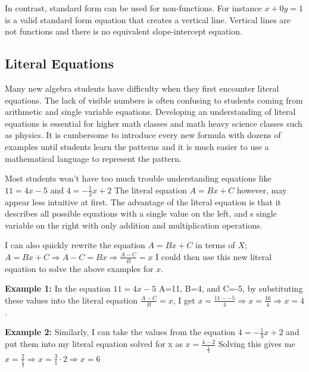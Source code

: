 \documentclass{article}
\begin{document}
\bigskip

In contrast, standard form can be used for non-functions. For instance $x+0y=1$ is a valid standard form equation that creates a vertical line. Vertical lines are not functions and there is no equivalent slope-intercept equation.

\subsection{Literal Equations}
Many new algebra students have difficulty when they first encounter literal equations. The lack of visible numbers is often confusing to students coming from arithmetic and single variable equations. Developing an understanding of literal equations is essential for higher math classes and math heavy science classes such as physics. It is cumbersome to introduce every new formula with dozens of examples until students learn the patterns and it is much easier to use a mathematical language to represent the pattern.

\bigskip

Most students won't have too much trouble understanding equations like $11=4x-5$ and $4=-\frac{1}{3}x+2$ The literal equation $A=Bx+C$ however, may appear less intuitive at first. The advantage of the literal equation is that it describes all possible equations with a single value on the left, and s single variable on the right with only addition and multiplication operations.

\bigskip

I can also quickly rewrite the equation $A=Bx+C$ in terms of $X$; $A=Bx+C \Rightarrow A-C=Bx \Rightarrow \frac{A-C}{B}=x$\bigskip
I could then use this new literal equation to solve the above examples for $x$.

\bigskip
\textbf{Example 1:} In the equation $11=4x-5$ A=11, B=4, and C=-5, by substituting these values into the  literal equation $\frac{A-C}{B}=x$, I get $x=\frac{11--5}{4} \Rightarrow x=\frac{16}{4} \Rightarrow x=4$.

\bigskip

\textbf{Example 2:} Similarly, I can take the values from the equation $4=-\frac{1}{3}x+2$ and put them into my literal equation solved for x as $x=\frac{4-2}{\frac{1}{3}}$ Solving this gives me $x=\frac{2}{\frac{1}{3}} \Rightarrow x=\frac{3}{1}\cdot2 \Rightarrow x=6$ 
\end{document}
